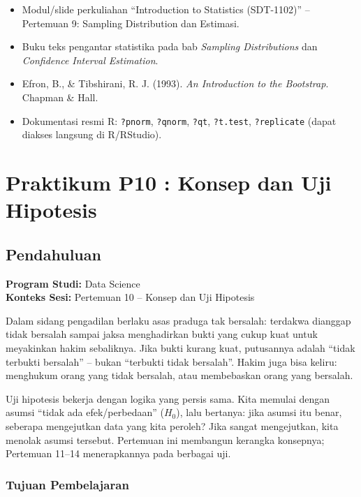 \documentclass[
  indonesian,
  letterpaper,
]{book}
\providecommand{\tightlist}{%
  \setlength{\itemsep}{0pt}\setlength{\parskip}{0pt}}
\begin{document}
\begin{itemize}
\tightlist
\item
  Modul/slide perkuliahan ``Introduction to Statistics (SDT-1102)'' --
  Pertemuan 9: Sampling Distribution dan Estimasi.
\item
  Buku teks pengantar statistika pada bab \emph{Sampling Distributions}
  dan \emph{Confidence Interval Estimation}.
\item
  Efron, B., \& Tibshirani, R. J. (1993). \emph{An Introduction to the
  Bootstrap}. Chapman \& Hall.
\item
  Dokumentasi resmi R: \texttt{?pnorm}, \texttt{?qnorm}, \texttt{?qt},
  \texttt{?t.test}, \texttt{?replicate} (dapat diakses langsung di
  R/RStudio).
\end{itemize}


\chapter{Praktikum P10 : Konsep dan Uji
Hipotesis}\label{praktikum-p10-konsep-dan-uji-hipotesis}

\section{Pendahuluan}\label{pendahuluan-1}

\textbf{Program Studi:} Data Science\\
\textbf{Konteks Sesi:} Pertemuan 10 -- Konsep dan Uji Hipotesis

Dalam sidang pengadilan berlaku asas praduga tak bersalah: terdakwa
dianggap tidak bersalah sampai jaksa menghadirkan bukti yang cukup kuat
untuk meyakinkan hakim sebaliknya. Jika bukti kurang kuat, putusannya
adalah ``tidak terbukti bersalah'' -- bukan ``terbukti tidak bersalah''.
Hakim juga bisa keliru: menghukum orang yang tidak bersalah, atau
membebaskan orang yang bersalah.

Uji hipotesis bekerja dengan logika yang persis sama. Kita memulai
dengan asumsi ``tidak ada efek/perbedaan'' (\(H_0\)), lalu bertanya:
jika asumsi itu benar, seberapa mengejutkan data yang kita peroleh? Jika
sangat mengejutkan, kita menolak asumsi tersebut. Pertemuan ini
membangun kerangka konsepnya; Pertemuan 11--14 menerapkannya pada
berbagai uji.

\subsection{Tujuan Pembelajaran}\label{tujuan-pembelajaran-1}
\end{document}
